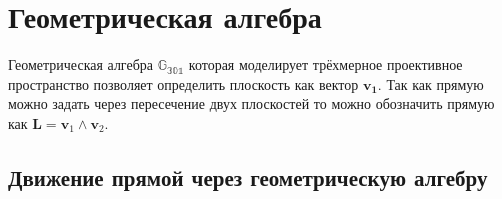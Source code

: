 
  \section{Геометрическая алгебра}

  Геометрическая алгебра $\mathbb{G_{301}}$ которая моделирует трёхмерное проективное пространство позволяет определить плоскость 
  как вектор $\mathbf{v_1}$. Так как прямую можно задать через пересечение двух плоскостей то можно
  обозначить прямую как $\mathbf{L} = \mathbf{v}_1 \wedge \mathbf{v}_2$.

  \subsection{Движение прямой через геометрическую алгебру}
  






